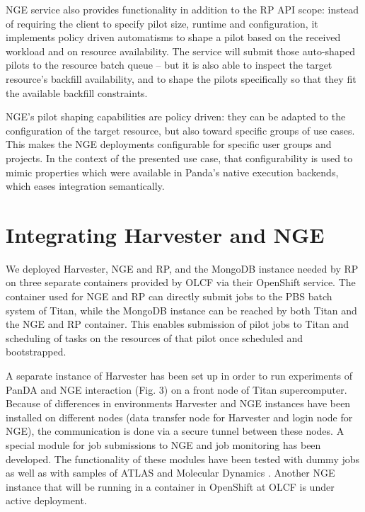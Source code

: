\documentclass{webofc}
\begin{document}
NGE service also provides functionality in addition to the RP API scope:
instead of requiring the client to specify pilot size, runtime and
configuration, it implements policy driven automatisms to shape a pilot based
on the received workload and on resource availability.  The service will
submit those auto-shaped pilots to the resource batch queue -- but it is also
able to inspect the target resource's backfill availability, and to shape the
pilots specifically so that they fit the available backfill constraints.
	
NGE's pilot shaping capabilities are policy driven: they can be adapted to
the configuration of the target resource, but also toward specific groups of
use cases. This makes the NGE deployments configurable for specific user
groups and projects.  In the context of the presented use case, that
configurability is used to mimic properties which were available in Panda's
native execution backends, which eases integration semantically.


\section{Integrating Harvester and NGE}

We deployed Harvester, NGE and RP, and the MongoDB instance needed by RP on
three separate containers provided by OLCF via their OpenShift service. The
container used for NGE and RP can directly submit jobs to the PBS batch
system of Titan, while the MongoDB instance can be reached by both Titan and
the NGE and RP container. This enables submission of pilot jobs to Titan and
scheduling of tasks on the resources of that pilot once scheduled and
bootstrapped.

A separate instance of Harvester has been set up in order to run experiments
of PanDA and NGE interaction (Fig. 3) on a front node of Titan supercomputer.
Because of differences in environments Harvester and NGE instances have been
installed on different nodes (data transfer node for Harvester and login node
for NGE), the communication is done via a secure tunnel between these nodes.
A special module for job submissions to NGE and job monitoring has been
developed. The functionality of these modules have been tested with dummy
jobs as well as with samples of ATLAS and Molecular Dynamics \cite{Brooks2009CHARMMTB}. Another
NGE instance that will be running in a container in OpenShift at OLCF is
under active deployment.
\end{document}
